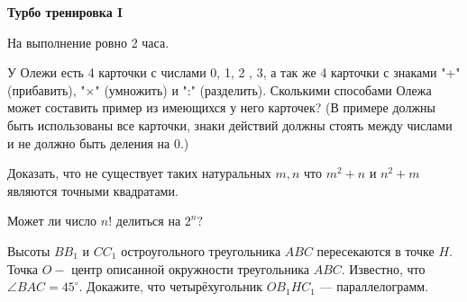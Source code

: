 \centerline{\bf \Huge Турбо тренировка I}
\centerline{\bf \Huge }

\begin{flushright}
        \scriptsize{На выполнение ровно 2 часа.}
\end{flushright}

У Олежи есть 4 карточки с числами 0, 1, 2 , 3, а так же 4 карточки с знаками "+" (прибавить), "×" (умножить) и ":" (разделить). Сколькими способами Олежа может составить пример из имеющихся у него карточек? (В примере должны быть использованы все карточки, знаки действий должны стоять между числами и не должно быть деления на 0.)

Доказать, что не существует таких натуральных $m, n$ что $m^2+n$ и $n^2+m$ являются точными квадратами.

Может ли число $n!$ делиться на $2^n?$

Высоты $B B_1$ и $C C_1$ остроугольного треугольника $A B C$ пересекаются в точке $H$. Точка $O-$ центр описанной окружности треугольника $A B C$. Известно, что $\angle B A C=45^{\circ}$. Докажите, что четырёхугольник $O B_1 H C_1$ — параллелограмм.